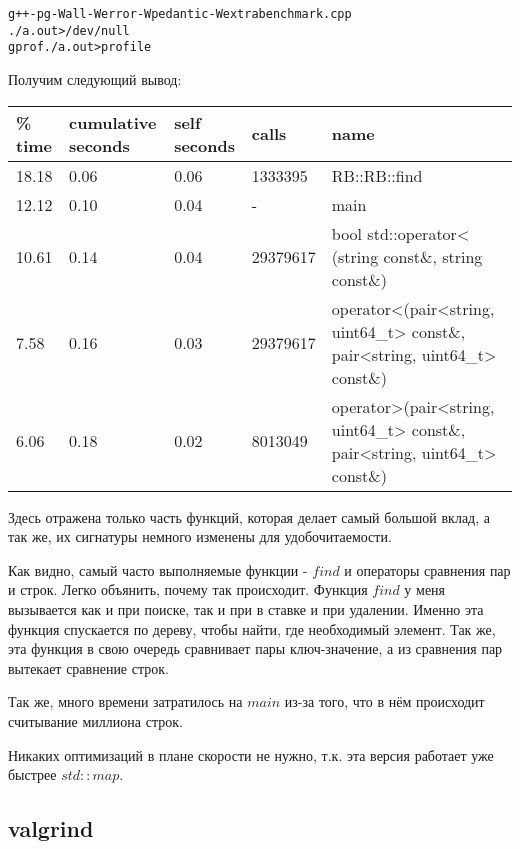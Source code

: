 \begin{alltt}
g++ -pg -Wall -Werror -Wpedantic -Wextra benchmark.cpp
./a.out > /dev/null
gprof ./a.out > profile
\end{alltt}

Получим следующий вывод:

\begin{table}[h]
\begin{center}

    \begin{tabular}{|p{1.5cm}|p{2cm}|p{1.5cm}|p{3.5cm}|p{7.5cm}|}
        \hline
        \% time & cumulative seconds & self seconds & calls & name \\
        \hline
         18.18 & 0.06 & 0.06 & 1333395 & RB::RB::find  \\
        \hline
         12.12 & 0.10 & 0.04 & - & main \\
        \hline
        10.61 & 0.14 & 0.04 & 29379617 & bool std::operator< (string const\&, string const\&) \\
        \hline
        7.58 & 0.16 & 0.03 & 29379617 & operator<(pair<string, uint64\_t> const\&, pair<string, uint64\_t> const\&) \\
        \hline
        6.06 & 0.18 & 0.02 & 8013049 & operator>(pair<string, uint64\_t> const\&, pair<string, uint64\_t> const\&) \\
        \hline
    \end{tabular}
    
\end{center}
\end{table}

Здесь отражена только часть функций, которая делает самый большой вклад, а так же, их сигнатуры немного изменены для удобочитаемости.

Как видно, самый часто выполняемые функции - $find$ и операторы сравнения пар и строк. Легко объянить, почему так происходит. Функция $find$ у меня вызывается как и при поиске, так и при в ставке и при удалении. Именно эта функция спускается по дереву, чтобы найти, где необходимый элемент. Так же, эта функция в свою очередь сравнивает пары ключ-значение, а из сравнения пар вытекает сравнение строк. 

Так же, много времени затратилось на $main$ из-за того, что в нём происходит считывание миллиона строк.

Никаких оптимизаций в плане скорости не нужно, т.к. эта версия работает уже быстрее $std::map$.

\subsection{valgrind}

